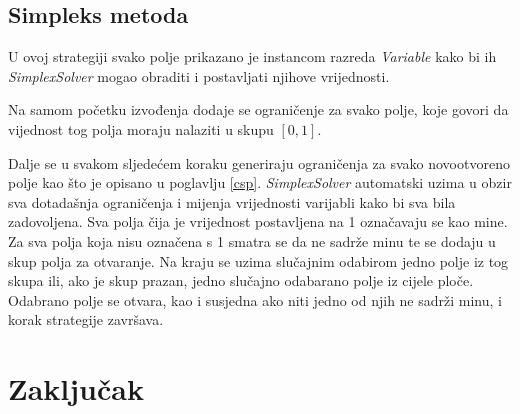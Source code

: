 \documentclass{article}
\begin{document}
\subsection{Simpleks metoda}

U ovoj strategiji svako polje prikazano je instancom razreda \textit{Variable} kako bi ih \textit{SimplexSolver} mogao obraditi i postavljati njihove vrijednosti.

Na samom početku izvođenja dodaje se ograničenje za svako polje, koje govori da vijednost tog polja moraju nalaziti u skupu $[0, 1]$.

Dalje se u svakom sljedećem koraku generiraju ograničenja za svako novootvoreno polje kao što je opisano u poglavlju \ref{csp}. \textit{SimplexSolver} automatski uzima u obzir sva dotadašnja ograničenja i mijenja vrijednosti varijabli kako bi sva bila zadovoljena. Sva polja čija je vrijednost postavljena na 1 označavaju se kao mine. Za sva polja koja nisu označena s 1 smatra se da ne sadrže minu te se dodaju u skup polja za otvaranje. Na kraju se uzima slučajnim odabirom jedno polje iz tog skupa ili, ako je skup prazan, jedno slučajno odabarano polje iz cijele ploče. Odabrano polje se otvara, kao i susjedna ako niti jedno od njih ne sadrži minu, i korak strategije završava.

\section{Zaključak}
\end{document}
